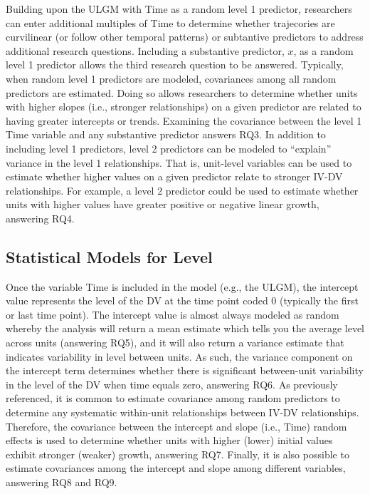 \documentclass[english,,man]{apa6}
\theoremstyle{definition}
\theoremstyle{definition}
\theoremstyle{definition}
\theoremstyle{remark}
\begin{document}
Building upon the ULGM with Time as a random level 1 predictor,
researchers can enter additional multiples of Time to determine whether
trajecories are curvilinear (or follow other temporal patterns) or
subtantive predictors to address additional research questions.
Including a substantive predictor, \(x\), as a random level 1 predictor
allows the third research question to be answered. Typically, when
random level 1 predictors are modeled, covariances among all random
predictors are estimated. Doing so allows researchers to determine
whether units with higher slopes (i.e., stronger relationships) on a
given predictor are related to having greater intercepts or trends.
Examining the covariance between the level 1 Time variable and any
substantive predictor answers RQ3. In addition to including level 1
predictors, level 2 predictors can be modeled to \enquote{explain}
variance in the level 1 relationships. That is, unit-level variables can
be used to estimate whether higher values on a given predictor relate to
stronger IV-DV relationships. For example, a level 2 predictor could be
used to estimate whether units with higher values have greater positive
or negative linear growth, answering RQ4.

\hypertarget{statistical-models-for-level}{%
\subsection{Statistical Models for
Level}\label{statistical-models-for-level}}

Once the variable Time is included in the model (e.g., the ULGM), the
intercept value represents the level of the DV at the time point coded 0
(typically the first or last time point). The intercept value is almost
always modeled as random whereby the analysis will return a mean
estimate which tells you the average level across units (answering RQ5),
and it will also return a variance estimate that indicates variability
in level between units. As such, the variance component on the intercept
term determines whether there is significant between-unit variability in
the level of the DV when time equals zero, answering RQ6. As previously
referenced, it is common to estimate covariance among random predictors
to determine any systematic within-unit relationships between IV-DV
relationships. Therefore, the covariance between the intercept and slope
(i.e., Time) random effects is used to determine whether units with
higher (lower) initial values exhibit stronger (weaker) growth,
answering RQ7. Finally, it is also possible to estimate covariances
among the intercept and slope among different variables, answering RQ8
and RQ9.
\end{document}
